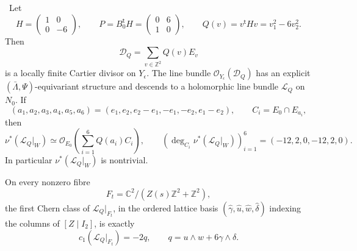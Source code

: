 \begin{proposition}
\label{wbII:prop:local-cusp-picard-obstruction}
\ Let
\[
 H=\begin{pmatrix}1&0\\0&-6\end{pmatrix},
 \qquad
 P=B_0^{\mathsf t}H=\begin{pmatrix}0&6\\1&0\end{pmatrix},
 \qquad
 Q(v)=v^{\mathsf t}Hv=v_1^2-6v_2^2.
\tag{W.65}\label{wbII:eq:W:5.17x}
\]
Then
\[
 \mathcal D_Q=\sum_{v\in\mathbb Z^2}Q(v)E_v
\tag{W.66}\label{wbII:eq:W:5.17y}
\]
is a locally finite Cartier divisor on \(Y_\epsilon\).
The line bundle \(\mathcal O_{Y_\epsilon}(\mathcal D_Q)\) has an explicit
\((\bar\Lambda,\Psi)\)-equivariant structure and descends to a holomorphic
line bundle \(\mathcal L_Q\) on \(N_0\).  If
\[
 (a_1,a_2,a_3,a_4,a_5,a_6)
 =(e_1,e_2,e_2-e_1,-e_1,-e_2,e_1-e_2),
 \qquad C_i=E_0\cap E_{a_i},
\]
then
\[
 \nu^*(\mathcal L_Q|_W)
 \simeq
 \mathcal O_{E_0}\!\left(\sum_{i=1}^6Q(a_i)C_i\right),
\qquad
 \left(\deg_{C_i}\nu^*(\mathcal L_Q|_W)\right)_{i=1}^6
 =(-12,2,0,-12,2,0).
\tag{W.67}\label{wbII:eq:W:5.17z}
\]
In particular \(\nu^*(\mathcal L_Q|_W)\) is nontrivial.

On every nonzero fibre
\[
 F_t=\mathbb C^2/(Z(s)\mathbb Z^2+\mathbb Z^2),
\]
the first Chern class of \(\mathcal L_Q|_{F_t}\), in the ordered lattice
basis
\((\widehat\gamma,\widehat u,\widehat w,\widehat\delta)\) indexing the
columns of \([Z\mid I_2]\), is exactly
\[
 c_1(\mathcal L_Q|_{F_t})=-2q,
 \qquad
 q=u\wedge w+6\gamma\wedge\delta.
\tag{W.68}\label{wbII:eq:W:5.17aa}
\]
\end{proposition}

